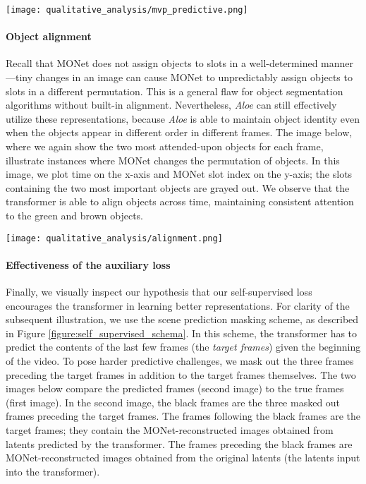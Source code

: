 \documentclass{article}
\newcommand{\Model}{\emph{Aloe}}
\begin{document}
\noindent\texttt{[image: qualitative\_analysis/mvp\_predictive.png]}

\paragraph{Object alignment}
Recall that MONet does not assign objects to slots in a well-determined manner---tiny changes in an image can cause MONet to unpredictably assign objects to slots in a different permutation.
This is a general flaw for object segmentation algorithms without built-in alignment.
Nevertheless, \Model{} can still effectively utilize
these representations,
because
\Model{} is able to maintain object identity even when the objects appear in different order in different frames.
The image below,
where we again show the two most attended-upon objects for each frame,
illustrate instances where MONet changes the permutation of objects.
In this image,
we plot time on the x-axis and MONet slot index on the y-axis;
the slots containing the two most important objects are grayed out.
We observe that the transformer is able to align objects across time,
maintaining consistent attention to the green and brown objects.

\begin{center}
\texttt{[image: qualitative\_analysis/alignment.png]}
\end{center}

\paragraph{Effectiveness of the auxiliary loss}
Finally, we visually inspect our hypothesis that our self-supervised loss
encourages the transformer in learning better representations.
For clarity of the subsequent illustration, we use the scene prediction masking scheme, as described in Figure \ref{figure:self_supervised_schema}.
In this scheme, the transformer has to predict the contents of the last few frames (the \emph{target frames}) given the beginning of the video.
To pose harder predictive challenges, we mask out the three frames preceding the target frames in addition to the target frames themselves.
The two images below compare the predicted frames (second image) to the true frames (first image).
In the second image, the black frames are the three masked out frames preceding the target frames.
The frames following the black frames are the target frames;
they contain the MONet-reconstructed images obtained from latents predicted by the transformer.
The frames preceding the black frames are MONet-reconstructed images obtained from the original latents (the latents input into the transformer).
\end{document}
